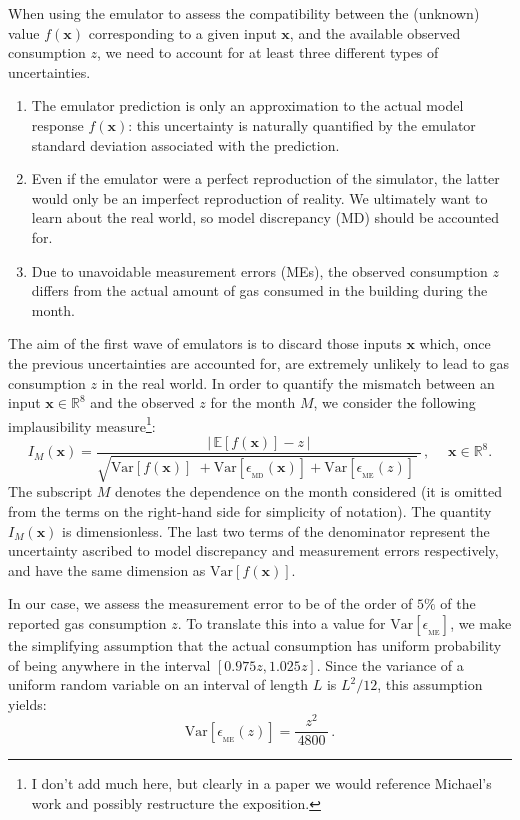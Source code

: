 \documentclass[a4paper, 12pt]{article}
\newcommand{\R}{\mathbb{R}}
\newcommand{\bd}[1]{\boldsymbol{#1}}
\newcommand{\x}{\bd x}
\newcommand{\E}{\mathbb{E}}
\newcommand{\Var}{\text{Var}}
\begin{document}
When using the emulator to assess the compatibility between the (unknown) value $f(\x)$ corresponding to a given input $\x$, and the available observed consumption $z$, we need to account for at least three different types of uncertainties.
\begin{enumerate}
 \item The emulator prediction is only an approximation to the actual model response
       $f(\x)$: this uncertainty is naturally quantified by the emulator standard deviation associated with the prediction.
 \item Even if the emulator were a perfect reproduction of the simulator, the latter
       would only be an imperfect reproduction of reality. We ultimately want to learn about the real world, so model discrepancy (MD) should be accounted for.
 \item Due to unavoidable measurement errors (MEs), the observed consumption $z$
       differs from the actual amount of gas consumed in the building during the month.
\end{enumerate}

The aim of the first wave of emulators is to discard those inputs $\x$ which, once the previous uncertainties are accounted for, are extremely unlikely to lead to gas consumption $z$ in the real world. In order to quantify the mismatch between an input $\x \in \R^8$ and the observed $z$ for the month $M$, we consider the following implausibility measure\footnote{
I don't add much here, but clearly in a paper we would reference Michael's work and possibly restructure the exposition.}:
\begin{equation}
 I_M(\x) = \frac{\big|\, \E[f(\x)] - z \,\big| }{ \sqrt{
 {\Var[f(\x)]}^{\phantom{i}} \!+ \Var[\epsilon_{_\text{MD}}(\x)] + \Var[\epsilon_{_\text{ME}}(z)] \,}^{\,}
       } \,, \;\quad \x \in \R^8.
\end{equation}
The subscript $M$ denotes the dependence on the month considered (it is omitted from the terms on the right-hand side for simplicity of notation).
The quantity $I_M(\x)$ is dimensionless. The last two terms of the denominator represent the uncertainty ascribed to model discrepancy and measurement errors respectively, and have the same dimension as $\Var[f(\x)]$.


In our case, we assess the measurement error to be of the order of $5\%$ of the reported gas consumption $z$. To translate this into a value for $\Var[\epsilon_{_\text{ME}}]$, we
make the simplifying assumption that the actual consumption has uniform probability of being anywhere in the interval $[0.975 z, 1.025 z]$. Since the variance of a uniform random variable on an interval of length $L$ is $L^2/12$, this assumption yields:
\begin{equation}
 \Var[\epsilon_{_\text{ME}}(z)] = \frac{z^2}{\,4800\,}\,.
\end{equation}
\end{document}

